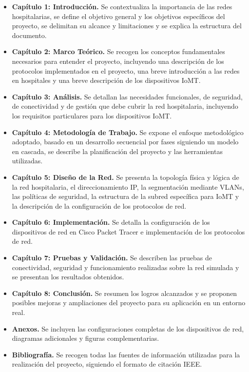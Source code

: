 \begin{itemize}
    \item \textbf{Capítulo 1: Introducción.} Se contextualiza la importancia de las redes hospitalarias, se define el objetivo general y los objetivos específicos del 
    proyecto, se delimitan su alcance y limitaciones y se explica la estructura del documento.
    \item \textbf{Capítulo 2: Marco Teórico.} Se recogen los conceptos fundamentales necesarios para entender el proyecto, incluyendo una descripción de los protocolos implementados 
    en el proyecto, una breve introducción a las redes en hospitales y una breve descripción de los dispositivos IoMT.
    \item \textbf{Capítulo 3: Análisis.} Se detallan las necesidades funcionales, de seguridad, de conectividad y de gestión que debe cubrir la red hospitalaria, 
    incluyendo los requisitos particulares para los dispositivos \acs{IoMT}.
    \item \textbf{Capítulo 4: Metodología de Trabajo.} Se expone el enfoque metodológico adoptado, basado en un desarrollo secuencial por fases siguiendo un modelo en cascada, 
    se describe la planificación del proyecto y las herramientas utilizadas.
    \item \textbf{Capítulo 5: Diseño de la Red.} Se presenta la topología física y lógica de la red hospitalaria, el direccionamiento \acs{IP}, la segmentación mediante \acs{VLAN}s, las 
    políticas de seguridad, la estructura de la subred específica para \acs{IoMT} y la descripción de la configuración de los protocolos de red.
    \item \textbf{Capítulo 6: Implementación.} Se detalla la configuración de los dispositivos de red en Cisco Packet Tracer e implementación de los protocolos de red.
    \item \textbf{Capítulo 7: Pruebas y Validación.} Se describen las pruebas de conectividad, seguridad y funcionamiento realizadas sobre la red simulada y se presentan los 
    resultados obtenidos.
    \item \textbf{Capítulo 8: Conclusión.} Se resumen los logros alcanzados y se proponen posibles mejoras y ampliaciones del 
    proyecto para su aplicación en un entorno real.
    \item \textbf{Anexos.} Se incluyen las configuraciones completas de los dispositivos de red, diagramas adicionales y figuras complementarias.
    \item \textbf{Bibliografía.} Se recogen todas las fuentes de información utilizadas para la realización del proyecto, siguiendo el formato de citación \acs{IEEE}.
\end{itemize}